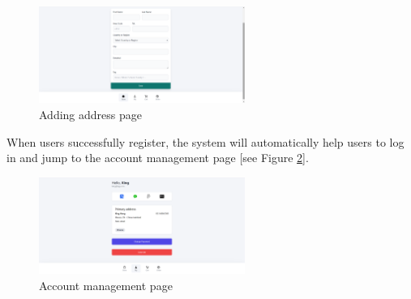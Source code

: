 \documentclass{article}
\begin{document}
\begin{figure}[!htp]
    \centering
    \includegraphics[width=0.6\textwidth]{add address.png}
    \caption{\label{fig:add address} Adding address page }
\end{figure}
When users successfully register, the system will automatically help users to log in and jump to the account management page [see Figure \ref{fig:account management page}].
\begin{figure}[!htp]
    \centering
    \includegraphics[width=0.6\textwidth]{account management.png}
    \caption{\label{fig:account management page} Account management page}
\end{figure}
\end{document}
